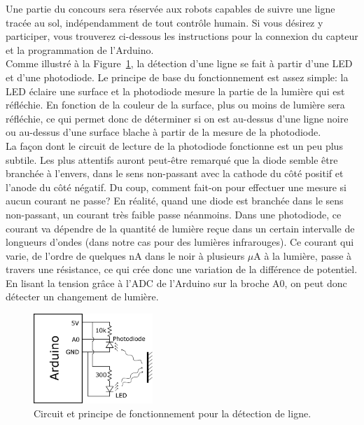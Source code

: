 Une partie du concours sera réservée aux robots capables de suivre une ligne tracée au sol, indépendamment de tout contrôle humain. Si vous désirez y participer, vous trouverez ci-dessous les instructions pour la connexion du capteur et la programmation de l'Arduino. \\

Comme illustré à la Figure~\ref{fig:circuit}, la détection d'une ligne se fait à partir d'une LED et d'une photodiode. Le principe de base du fonctionnement est assez simple: la LED éclaire une surface et la photodiode mesure la partie de la lumière qui est réfléchie. En fonction de la couleur de la surface, plus ou moins de lumière sera réfléchie, ce qui permet donc de déterminer si on est au-dessus d'une ligne noire ou au-dessus d'une surface blache à partir de la mesure de la photodiode.\\

La façon dont le circuit de lecture de la photodiode fonctionne est un peu plus subtile. Les plus attentifs auront peut-être remarqué que la diode semble être branchée à l'envers, dans le sens non-passant avec la cathode du côté positif et l'anode du côté négatif. Du coup, comment fait-on pour effectuer une mesure si aucun courant ne passe? En réalité, quand une diode est branchée dans le sens non-passant, un courant très faible passe néanmoins. Dans une photodiode, ce courant va dépendre de la quantité de lumière reçue dans un certain intervalle de longueurs d'ondes (dans notre cas pour des lumières infrarouges). Ce courant qui varie, de l'ordre de quelques nA dans le noir à plusieurs $\mu$A à la lumière, passe à travers une résistance, ce qui crée donc une variation de la différence de potentiel. En lisant la tension grâce à l'ADC de l'Arduino sur la broche A0, on peut donc détecter un changement de lumière.\\

\begin{figure}[!t]
\centering
\includegraphics[width=0.4\textwidth]{imgs/circuit.eps}
\caption{Circuit et principe de fonctionnement pour la détection de ligne.}
\label{fig:circuit}
\end{figure}

